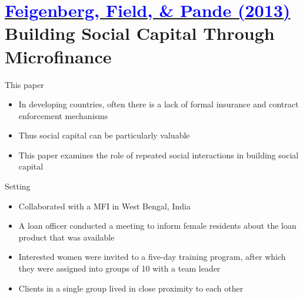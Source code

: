 \documentclass[11pt,notes=hide,aspectratio=169,mathserif]{beamer}
\begin{document}
\section*{\href{https://www.nber.org/system/files/working_papers/w16018/w16018.pdf}{\textcolor{blue}{Feigenberg, Field, \& Pande (2013)}} \\[5mm] 
\textnormal{\small{Building Social Capital Through Microfinance}}}


\begin{frame}{This paper}

\begin{itemize}
\item In developing countries, often there is a lack of formal insurance and contract enforcement mechanisms
\item Thus social capital can be particularly valuable 
\item This paper examines the role of repeated social interactions in building social capital
\end{itemize}
\end{frame}

\begin{frame}{Setting}

\begin{itemize}
\item Collaborated with a MFI in West Bengal, India 
\item A loan officer conducted a meeting to inform female residents about the loan product that was available
\item Interested women were invited to a five-day training program, after which they were assigned into groups of 10 with a team leader
\item Clients in a single group lived in close proximity to each other
\end{itemize}
\end{frame}
\end{document}
